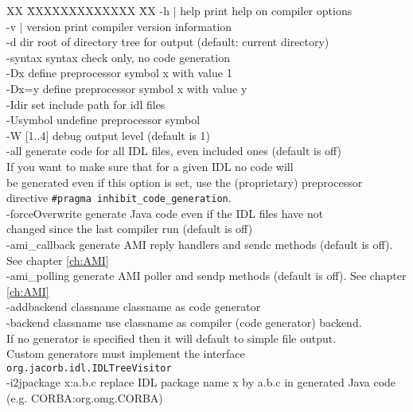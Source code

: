 \begin{tabbing}
XX \= XXXXXXXXXXXXX \= XX \kill
\>  -h $|$ help \>  print help on compiler options\\
\>  -v $|$ version \> print compiler version information\\
\>  -d dir \> root of directory tree for output (default: current directory)\\
\>  -syntax \> syntax check only, no code generation\\
\>  -Dx \>  define preprocessor symbol x with value 1\\
\>  -Dx=y  \>  define preprocessor symbol x with value y\\
\>  -Idir  \>  set include path for idl files\\
\>  -Usymbol \> undefine preprocessor symbol\\
\>  -W [1..4] \> debug output level (default is 1)\\
\>  -all  \> generate code for all IDL files, even included ones
(default is off)\\
\> \> If you want to make sure that for a given IDL no code will\\
\> \>  be generated even if this option is set, use the (proprietary)
preprocessor \\
\> \> directive {\tt \#pragma   inhibit\_code\_generation}.\\
\>  -forceOverwrite \> generate Java code even if the IDL files have
not \\
\> \> changed since the last compiler run (default is off)\\
\>  -ami\_callback  \> generate AMI reply handlers and sendc methods
(default is off). See chapter \ref{ch:AMI}\\
\>  -ami\_polling  \>  generate AMI poller and sendp methods (default
is off). See chapter \ref{ch:AMI}\\
\>  -addbackend classname \>  classname as code generator\\
\>  -backend classname \>  use classname as compiler (code generator) backend.\\
\> \>If no generator is specified then it will default to simple file output.\\
\> \>Custom generators must implement the interface\\
\> \> {\tt org.jacorb.idl.IDLTreeVisitor}\\
\> -i2jpackage x:a.b.c \>  replace IDL package name x by a.b.c in
generated Java code \\
\> \> (e.g. CORBA:org.omg.CORBA)\\

\end{tabbing}
